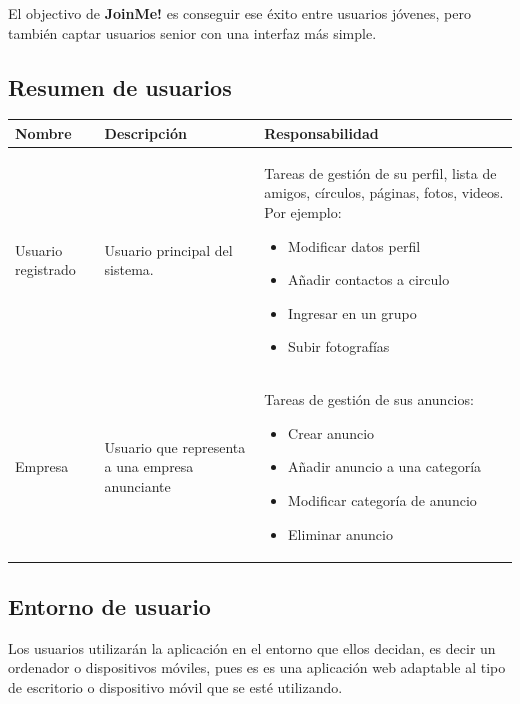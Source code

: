 \documentclass[12pt, a4paper, titlepage]{article}
\begin{document}
El objectivo de \textbf{JoinMe!} es conseguir ese éxito entre usuarios jóvenes, pero también captar usuarios senior con una interfaz más simple.



\newpage
\subsection{Resumen de usuarios}

\begin{center}
	\begin{tabular}{| p{4cm} | p{3cm} | p{8cm} |}
		\hline
		\textbf{Nombre} & \textbf{Descripción} & \textbf{Responsabilidad}  \\ \hline
		Usuario registrado &  
		Usuario principal del sistema.  & Tareas de gestión de su perfil, lista de amigos, círculos, páginas, fotos, videos. Por ejemplo: 
		\begin{itemize}
		    \item Modificar datos perfil
            \item Añadir contactos a circulo
			\item Ingresar en un grupo
			\item Subir fotografías
        \end{itemize} \\ \hline	
        Empresa & Usuario que representa a una empresa anunciante
        & Tareas de gestión de sus anuncios: 
        \begin{itemize}
        	\item Crear anuncio
        	\item Añadir anuncio a una categoría
        	\item Modificar categoría de anuncio
        	\item Eliminar anuncio
        \end{itemize} \\ \hline
	\end{tabular}
\end{center}

\subsection{Entorno de usuario}

Los usuarios utilizarán la aplicación en el entorno que ellos decidan, es decir un ordenador o dispositivos móviles, pues es es una aplicación web adaptable al tipo de escritorio o dispositivo móvil que se esté utilizando.
\end{document}
